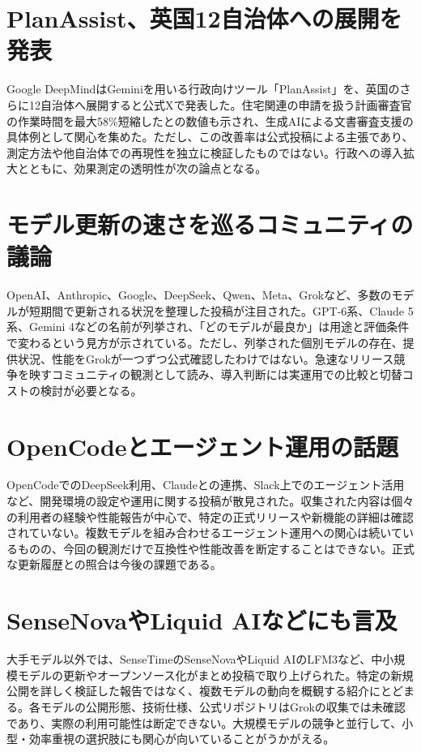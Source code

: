 \section{PlanAssist、英国12自治体への展開を発表}
Google DeepMindはGeminiを用いる行政向けツール「PlanAssist」を、英国のさらに12自治体へ展開すると公式Xで発表した。住宅関連の申請を扱う計画審査官の作業時間を最大58\%短縮したとの数値も示され、生成AIによる文書審査支援の具体例として関心を集めた。ただし、この改善率は公式投稿による主張であり、測定方法や他自治体での再現性を独立に検証したものではない。行政への導入拡大とともに、効果測定の透明性が次の論点となる。

\section{モデル更新の速さを巡るコミュニティの議論}
OpenAI、Anthropic、Google、DeepSeek、Qwen、Meta、Grokなど、多数のモデルが短期間で更新される状況を整理した投稿が注目された。GPT-6系、Claude 5系、Gemini 4などの名前が列挙され、「どのモデルが最良か」は用途と評価条件で変わるという見方が示されている。ただし、列挙された個別モデルの存在、提供状況、性能をGrokが一つずつ公式確認したわけではない。急速なリリース競争を映すコミュニティの観測として読み、導入判断には実運用での比較と切替コストの検討が必要となる。

\section{OpenCodeとエージェント運用の話題}
OpenCodeでのDeepSeek利用、Claudeとの連携、Slack上でのエージェント活用など、開発環境の設定や運用に関する投稿が散見された。収集された内容は個々の利用者の経験や性能報告が中心で、特定の正式リリースや新機能の詳細は確認されていない。複数モデルを組み合わせるエージェント運用への関心は続いているものの、今回の観測だけで互換性や性能改善を断定することはできない。正式な更新履歴との照合は今後の課題である。

\section{SenseNovaやLiquid AIなどにも言及}
大手モデル以外では、SenseTimeのSenseNovaやLiquid AIのLFM3など、中小規模モデルの更新やオープンソース化がまとめ投稿で取り上げられた。特定の新規公開を詳しく検証した報告ではなく、複数モデルの動向を概観する紹介にとどまる。各モデルの公開形態、技術仕様、公式リポジトリはGrokの収集では未確認であり、実際の利用可能性は断定できない。大規模モデルの競争と並行して、小型・効率重視の選択肢にも関心が向いていることがうかがえる。
